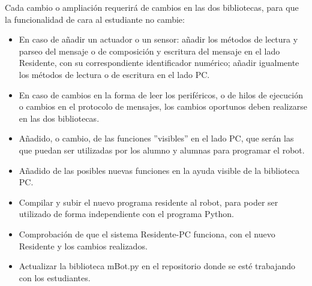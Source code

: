 Cada cambio o ampliación requerirá de cambios en las dos bibliotecas, para que la funcionalidad de cara al estudiante no cambie:
\begin{itemize}
	\item En caso de añadir un actuador o un sensor: añadir los métodos de lectura y parseo del mensaje o de composición y escritura del mensaje  en el lado Residente, con su correspondiente identificador numérico; añadir igualmente los métodos de lectura o de escritura en el lado PC.
	\item En caso de cambios en la forma de leer los periféricos, o de hilos de ejecución o cambios en el protocolo de mensajes, los cambios oportunos deben realizarse en las dos bibliotecas.
	\item Añadido, o cambio, de las funciones ''visibles'' en el lado PC, que serán las que puedan ser utilizadas por los alumno y alumnas para programar el robot. 
	\item Añadido de las posibles nuevas funciones en la ayuda visible de la biblioteca PC.
	\item Compilar y subir el nuevo programa residente al robot, para poder ser utilizado de forma independiente con el programa Python.
	\item Comprobación de que el sistema Residente-PC funciona, con el nuevo Residente y los cambios realizados. 
	\item Actualizar la biblioteca mBot.py en el repositorio donde se esté trabajando con los estudiantes. 
\end{itemize}